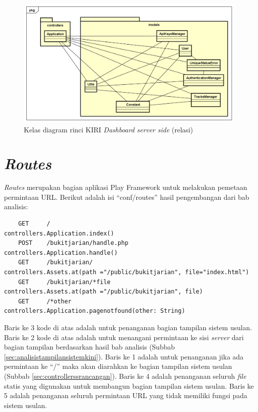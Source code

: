 \begin{figure}[htbp]
	\centering
		\includegraphics[scale=0.55]{Gambar/4_classdiagram_relasi.png}
	\caption{Kelas diagram rinci KIRI \textit{Dashboard server side} (relasi)}
	\label{fig:4_classdiagramrelasi}
\end{figure}

\section{\textit{Routes}}
\label{sec:perancanganroutes}
\textit{Routes} merupakan bagian aplikasi Play Framework untuk melakukan pemetaan permintaan URL. Berikut adalah isi ``conf/routes'' hasil pengembangan dari bab analisis:
\begin{lstlisting}
	GET		/	 		 					 controllers.Application.index()
	POST	/bukitjarian/handle.php	 		 controllers.Application.handle()
	GET     /bukitjarian/		             controllers.Assets.at(path ="/public/bukitjarian", file="index.html")
	GET     /bukitjarian/*file         		 controllers.Assets.at(path ="/public/bukitjarian", file)
	GET     /*other	         		 	     controllers.Application.pagenotfound(other: String)
\end{lstlisting}

Baris ke 3 kode di atas adalah untuk penanganan bagian tampilan sistem usulan. Baris ke 2 kode di atas adalah untuk menangani permintaan ke sisi \textit{server} dari bagian tampilan berdasarkan hasil bab analisis (Subbab \ref{sec:analisistampilansistemkini}). Baris ke 1 adalah untuk penanganan jika ada permintaan ke ``/'' maka akan diarahkan ke bagian tampilan sistem usulan (Subbab \ref{sec:controllerssrancangan}). Baris ke 4 adalah penanganan seluruh \textit{file} statis yang digunakan untuk membangun bagian tampilan sistem usulan. Baris ke 5 adalah penanganan seluruh permintaan URL yang tidak memiliki fungsi pada sistem usulan.

